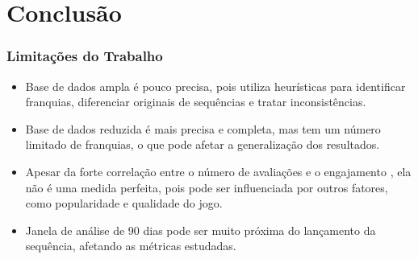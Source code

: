 \section{Conclusão}
\begin{frame}
\frametitle{Limitações do Trabalho}
\justifying

\begin{itemize}
    \item  Base de dados ampla é pouco precisa, pois utiliza heurísticas para identificar franquias, 
    diferenciar originais de sequências e tratar inconsistências.
    \vspace{0.2cm}

    \item Base de dados reduzida é mais precisa e completa, mas tem um número limitado de franquias, 
    o que pode afetar a generalização dos resultados.
    \vspace{0.2cm}

    \item Apesar da forte correlação entre o número de avaliações e o engajamento \cite{lin2018empirical}, ela não
    é uma medida perfeita, pois pode ser influenciada por outros fatores, como popularidade e qualidade do jogo.
    \vspace{0.2cm}

    \item Janela de análise de 90 dias pode ser muito próxima do lançamento da sequência, afetando as métricas estudadas.
    \vspace{0.8cm}

\end{itemize}    
\end{frame}
